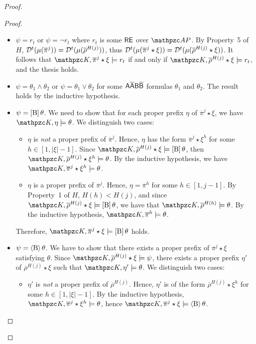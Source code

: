 \begin{proof}
\begin{proof}
\begin{itemize}
  \item $\psi= r_t$ or $\psi=\neg r_t$ where $r_t$ is some $\mathsf{RE}$ over $\Prop$. By Property~5 of $H$, 
   $\mathcal{D}^t(\mu(\overline{\pi}^j))=\mathcal{D}^t(\mu(\overline{\rho}^{H(j)}))$, thus $\mathcal{D}^t(\mu(\overline{\pi}^j\star \xi))=\mathcal{D}^t(\mu(\overline{\rho}^{H(j)}\star \xi))$. It follows that
    $\Ku, \overline{\pi}^{j}\star \xi \models r_t$ if and only if $\Ku,\overline{\rho}^{H(j)}\star \xi \models r_t$, and the thesis holds.
%
    \item $\psi= \theta_1\wedge\theta_2$ or $\psi= \theta_1\vee\theta_2$ for some $\mathsf{A\overline{A}B\overline{B}}$ formulas $\theta_1$ and $\theta_2$. 
    The result holds by the inductive hypothesis.
%
   \item $\psi = \operatorname{\mathopen[ B \mathclose]}\theta$. We need to show that for each proper prefix $\eta$ of $\overline{\pi}^{j}\star \xi$, we have $\Ku,\eta\models\theta$. We distinguish two cases:
     \begin{itemize}
       \item $\eta$ is \emph{not} a proper prefix of $\overline{\pi}^{j}$. Hence, $\eta$ has the form $ \overline{\pi}^{j}\star \xi^h$ for some $h\in [1,|\xi|-1]$. Since $\Ku,\overline{\rho}^{H(j)}\star \xi\models \hsBu\theta $, then
       $\Ku,\overline{\rho}^{H(j)}\star \xi^h\models \theta $.  By the inductive hypothesis, we have $\Ku,\overline{\pi}^j\star \xi^h\models \theta $.
       \item $\eta$ is a proper prefix of $\overline{\pi}^{j}$. Hence, $\eta = \overline{\pi}^{h}$ for some $h\in [1,j-1]$.   By Property~1 of $H$, $H(h)<H(j)$, and since $\Ku,\overline{\rho}^{H(j)}\star \xi\models \hsBu\theta $, we have that $\Ku,\overline{\rho}^{H(h)}\models \theta $. By the inductive hypothesis, $\Ku,\overline{\pi}^h\models \theta $.
     \end{itemize}
    Therefore, $\Ku,\overline{\pi}^j\star \xi\models \hsBu\theta $ holds.
%
    \item $\psi = \operatorname{\langle B\rangle}\theta$. We have to show that there exists a proper prefix of $\overline{\pi}^{j}\star \xi$ satisfying $\theta$.
Since $\Ku,\overline{\rho}^{H(j)}\star \xi\models \psi $, there exists a proper prefix $\eta'$ of  $\overline{\rho}^{H(j)}\star \xi$
 such that  $\Ku,\eta'\models \theta $. We distinguish two cases:
 \begin{itemize}
   \item $\eta'$ is \emph{not} a proper prefix of $\overline{\rho}^{H(j)}$. Hence, $\eta'$ is of the form $\overline{\rho}^{H(j)}\star \xi^h$ for some $h\in [1,|\xi|-1]$. By the inductive hypothesis, $\Ku,\overline{\pi}^j\star \xi^h\models \theta $, hence $\Ku,\overline{\pi}^j\star \xi\models \hsB\theta $.

\end{itemize}
\end{itemize}
\end{proof}
\end{proof}
